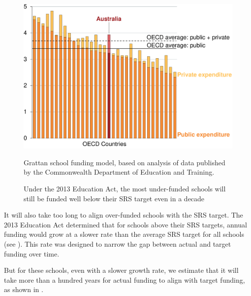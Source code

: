 \documentclass{grattan}
\begin{document}
\begin{figure}
\caption{Under the 2013 Education Act, the most under-funded schools will still be funded well below their SRS target even in a decade}\label{fig:some-underfunded-schools-still-below-target-even-in-a-decade}

\includegraphics[page=6]{atlas/Charts.pdf}

{Grattan school funding model, based on analysis of data published by the Commonwealth Department of Education and Training.}
\end{figure}

It will also take too long to align over-funded schools with the SRS target.
The 2013 Education Act determined that for schools above their SRS targets, annual funding would grow at a slower rate than the average SRS target for all schools (see ).
This rate was designed to narrow the gap between actual and target funding over time.

But for these schools, even with a slower growth rate, we estimate that it will take more than a hundred years for actual funding to align with target funding, as shown in .
\end{document}
